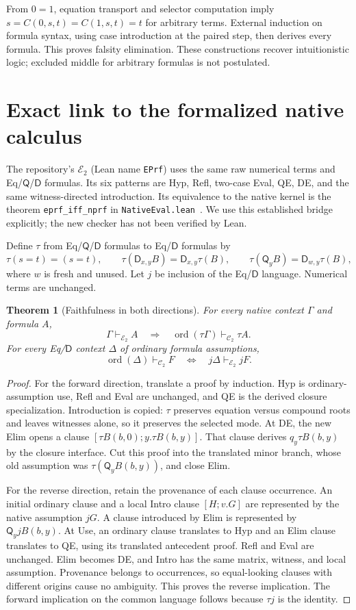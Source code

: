 \documentclass[11pt]{article}
\newtheorem{theorem}{Theorem}[section]
\theoremstyle{definition}\newtheorem{definition}[theorem]{Definition}
\newcommand{\Ctwo}{\mathcal C_2}
\newcommand{\E}{\mathcal E_2}
\newcommand{\D}{\mathsf D}
\newcommand{\Q}{\mathsf Q}
\newcommand{\ord}{\operatorname{ord}}
\begin{document}
From $0=1$, equation transport and selector computation imply
$s=C(0,s,t)=C(1,s,t)=t$ for arbitrary terms. External induction on
formula syntax, using case introduction at the paired step, then
derives every formula. This proves falsity elimination. These
constructions recover intuitionistic logic; excluded middle for
arbitrary formulas is not postulated.

\section{Exact link to the formalized native calculus}
\label{sec:native}

The repository's $\E$ (Lean name \texttt{EPrf}) uses the same raw
numerical terms and Eq/$\Q$/$\D$ formulas. Its six patterns are
Hyp, Refl, two-case Eval, QE, DE, and the same witness-directed
introduction. Its equivalence to the native kernel is the theorem
\texttt{eprf\_iff\_nprf} in \texttt{NativeEval.lean}~\cite{lean}.
We use this established bridge explicitly; the new checker has not
been verified by Lean.

Define $\tau$ from Eq/$\Q$/$\D$ formulas to Eq/$\D$ formulas by
\[
 \tau(s=t)=(s=t),\qquad
 \tau(\D_{x,y}B)=\D_{x,y}\tau(B),\qquad
 \tau(\Q_yB)=\D_{w,y}\tau(B),
\]
where $w$ is fresh and unused. Let $j$ be inclusion of the Eq/$\D$
language. Numerical terms are unchanged.

\begin{theorem}[Faithfulness in both directions]\label{thm:faithful}
For every native context $\Gamma$ and formula $A$,
\[
 \Gamma\vdash_{\E}A
 \quad\Longrightarrow\quad
 \ord(\tau\Gamma)\vdash_{\Ctwo}\tau A.
\]
For every Eq/$\D$ context $\Delta$ of ordinary formula assumptions,
\[
 \ord(\Delta)\vdash_{\Ctwo}F
 \quad\Longleftrightarrow\quad
 j\Delta\vdash_{\E}jF.
\]
\end{theorem}
\begin{proof}
For the forward direction, translate a proof by induction. Hyp is
ordinary-assumption use, Refl and Eval are unchanged, and QE is the
derived closure specialization. Introduction is copied: $\tau$
preserves equation versus compound roots and leaves witnesses alone,
so it preserves the selected mode. At DE, the new Elim opens a clause
$[\tau B(b,0);y.\tau B(b,y)]$. That clause derives
$q_y\tau B(b,y)$ by the closure interface. Cut this proof into the
translated minor branch, whose old assumption was
$\tau(\Q_yB(b,y))$, and close Elim.

For the reverse direction, retain the provenance of each clause
occurrence. An initial ordinary clause and a local Intro clause
$[H;v.G]$ are represented by the native assumption $jG$.
A clause introduced by Elim is represented by $\Q_yjB(b,y)$.
At Use, an ordinary clause translates to Hyp and an Elim clause
translates to QE, using its translated antecedent proof. Refl and
Eval are unchanged. Elim becomes DE, and Intro has the same matrix,
witness, and local assumption. Provenance belongs to occurrences,
so equal-looking clauses with different origins cause no ambiguity.
This proves the reverse implication. The forward implication on
the common language follows because $\tau j$ is the identity.
\end{proof}
\end{document}
